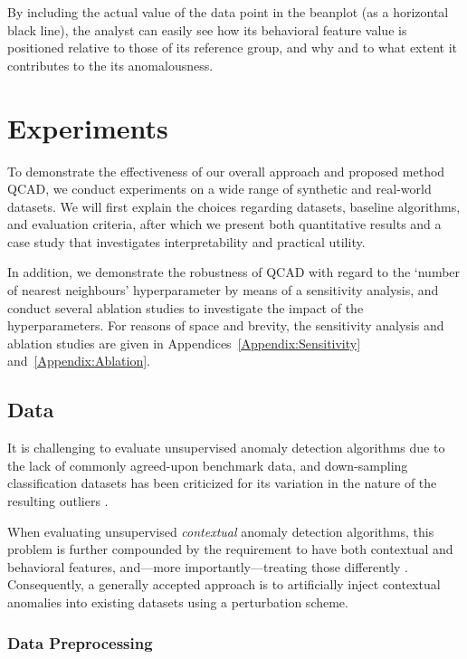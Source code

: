 \documentclass[pdflatex,sn-basic]{sn-jnl}%
\theoremstyle{thmstyleone}%
\theoremstyle{thmstyletwo}%
\theoremstyle{thmstylethree}%
\begin{document}
By including the actual value of the data point in the beanplot (as a horizontal black line), the analyst can easily see how its behavioral feature value is positioned relative to those of its reference group, and why and to what extent it contributes to the its anomalousness. 

\section{Experiments}
\label{sec:experiments}

To demonstrate the effectiveness of our overall approach and proposed method QCAD, we conduct experiments on a wide range of synthetic and real-world datasets. We will first explain the choices regarding datasets, baseline algorithms, and evaluation criteria, after which we present both quantitative results and a case study that investigates interpretability and practical utility.

In addition, we demonstrate the robustness of QCAD with regard to the `number of nearest neighbours' hyperparameter by means of a sensitivity analysis, and conduct several ablation studies to investigate the impact of the hyperparameters. For reasons of space and brevity, the sensitivity analysis and
ablation studies are given in Appendices~\ref{Appendix:Sensitivity} and~\ref{Appendix:Ablation}.

\subsection{Data}
\label{subsec:datasets}

It is challenging to evaluate unsupervised anomaly detection algorithms due to the lack of commonly agreed-upon benchmark data, and down-sampling classification datasets has been criticized for its variation in the nature of the resulting outliers \citep{farber2010using,campos2016evaluation}.

When evaluating unsupervised \emph{contextual} anomaly detection algorithms, this problem is further compounded by the requirement to have both contextual and behavioral features, and---more importantly---treating those differently \citep{liang2016robust}. Consequently, a generally accepted approach is to artificially inject contextual anomalies into existing datasets using a perturbation scheme.

\subsubsection{Data Preprocessing}
\label{prelim:gower}
\end{document}
